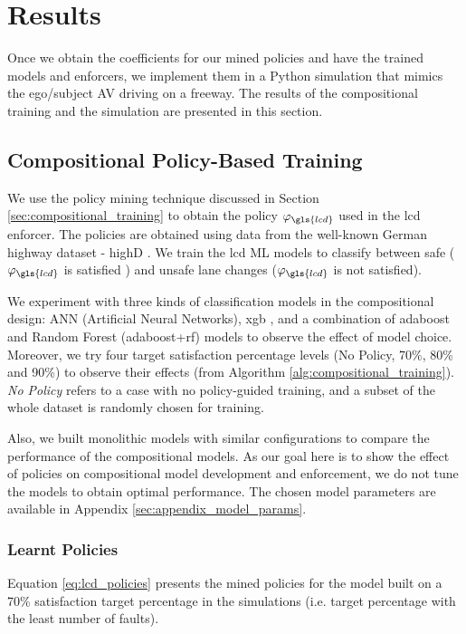 \section{Results}
\label{sec:results}
Once we obtain the coefficients for our mined policies and have the trained models and enforcers, we implement them in a Python simulation that mimics the ego/subject AV driving on a freeway. The results of the compositional training and the simulation are presented in this section.


\subsection{Compositional Policy-Based Training}
\label{sec:training_result}

We use the policy mining technique discussed in Section \ref{sec:compositional_training} to obtain the policy $\varphi_{\gls{lcd}}$ used in the \gls{lcd} enforcer. The policies are obtained using data from the well-known German highway dataset - highD \cite{krajewski_highd_2018}. We train the \gls{lcd} ML models to classify between safe ($\varphi_{\gls{lcd}}$ is satisfied ) and unsafe lane changes ($\varphi_{\gls{lcd}}$ is not satisfied). 

We experiment with three kinds of classification models in the compositional design: ANN (Artificial Neural Networks), \gls{xgb} \cite{Chen_xgboost}, and a combination of  \gls{adaboost} \cite{FREUND1997119_adaboost} and Random Forest \cite{598994_random_forest} (\gls{adaboost}+\gls{rf}) models to observe the effect of model choice. Moreover, we try four target satisfaction percentage levels (No Policy, 70\%, 80\% and 90\%) to observe their effects (from Algorithm \ref{alg:compositional_training}). \emph{No Policy} refers to a case with no policy-guided training, and a subset of the whole dataset is randomly chosen for training. 

Also, we built monolithic models with similar configurations to compare the performance of the compositional models. As our goal here is to show the effect of policies on compositional model development and enforcement, we do not tune the models to obtain optimal performance. The chosen model parameters are available in Appendix \ref{sec:appendix_model_params}.


\subsubsection{Learnt Policies}
Equation \ref{eq:lcd_policies} presents the mined policies for the model built on a 70\% satisfaction target percentage in the simulations (i.e. target percentage with the least number of faults).


